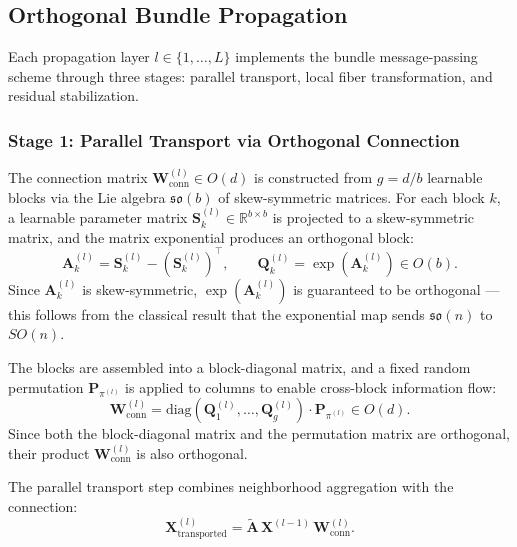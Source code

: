 \subsection{Orthogonal Bundle Propagation}

Each propagation layer $l \in \{1, \ldots, L\}$ implements the bundle message-passing scheme through three stages: parallel transport, local fiber transformation, and residual stabilization.

\subsubsection{Stage 1: Parallel Transport via Orthogonal Connection}

The connection matrix $\mathbf{W}_{\text{conn}}^{(l)} \in O(d)$ is constructed from $g = d/b$ learnable blocks via the Lie algebra $\mathfrak{so}(b)$ of skew-symmetric matrices. For each block $k$, a learnable parameter matrix $\mathbf{S}_k^{(l)} \in \mathbb{R}^{b \times b}$ is projected to a skew-symmetric matrix, and the matrix exponential produces an orthogonal block:
\begin{equation}
    \mathbf{A}_k^{(l)} = \mathbf{S}_k^{(l)} - \left(\mathbf{S}_k^{(l)}\right)^\top, \qquad
    \mathbf{Q}_k^{(l)} = \exp\!\left(\mathbf{A}_k^{(l)}\right) \in O(b).
\end{equation}
Since $\mathbf{A}_k^{(l)}$ is skew-symmetric, $\exp(\mathbf{A}_k^{(l)})$ is guaranteed to be orthogonal --- this follows from the classical result that the exponential map sends $\mathfrak{so}(n)$ to $SO(n)$.

The blocks are assembled into a block-diagonal matrix, and a fixed random permutation $\mathbf{P}_{\pi^{(l)}}$ is applied to columns to enable cross-block information flow:
\begin{equation}
    \mathbf{W}_{\text{conn}}^{(l)} = \text{diag}\!\left(\mathbf{Q}_1^{(l)}, \ldots, \mathbf{Q}_g^{(l)}\right) \cdot \mathbf{P}_{\pi^{(l)}} \in O(d).
\end{equation}
Since both the block-diagonal matrix and the permutation matrix are orthogonal, their product $\mathbf{W}_{\text{conn}}^{(l)}$ is also orthogonal.

The parallel transport step combines neighborhood aggregation with the connection:
\begin{equation}
    \mathbf{X}_{\text{transported}}^{(l)} = \tilde{\mathbf{A}} \, \mathbf{X}^{(l-1)} \, \mathbf{W}_{\text{conn}}^{(l)}.
\end{equation}

